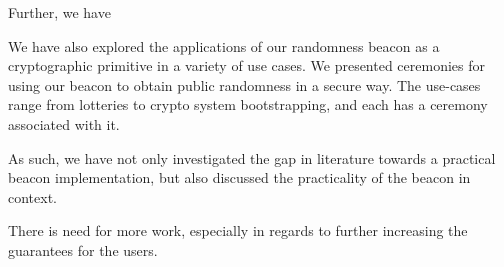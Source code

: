 Further, we have 

We have also explored the applications of our randomness beacon as a cryptographic primitive in a variety of use cases. We presented ceremonies for using our beacon to obtain public randomness in a secure way. The use-cases range from lotteries to crypto system bootstrapping, and each has a ceremony associated with it.

As such, we have not only investigated the gap in literature towards a practical beacon implementation, but also discussed the practicality of the beacon in context.



There is need for more work, especially in regards to further increasing the guarantees for the users.


